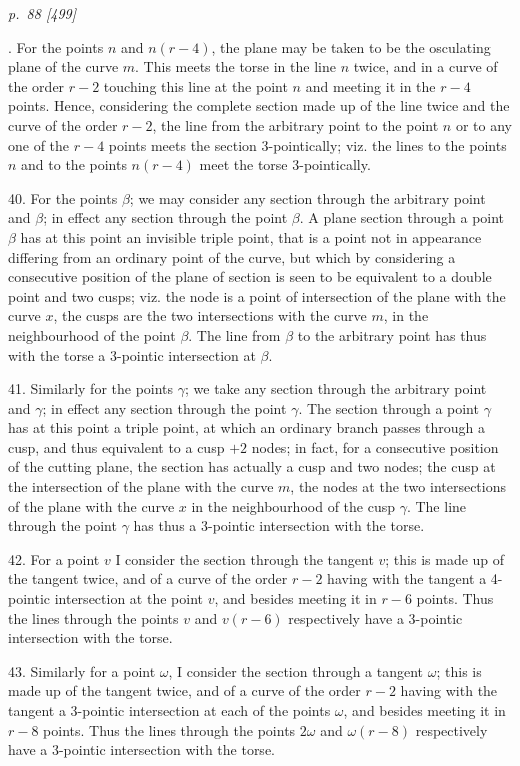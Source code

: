 \documentclass[11pt,a4paper]{article}
\newcommand{\pagemarker}[2]{\clearpage\noindent\textit{p.~#1 [#2]}\par\medskip}
\begin{document}
\pagemarker{88}{499}
39. For the points \(n\) and \(n(r-4)\), the plane may be taken to be the osculating
plane of the curve \(m\). This meets the torse in the line \(n\) twice, and in a curve
of the order \(r-2\) touching this line at the point \(n\) and meeting it in the \(r-4\)
points. Hence, considering the complete section made up of the line twice and the
curve of the order \(r-2\), the line from the arbitrary point to the point \(n\) or to
any one of the \(r-4\) points meets the section 3-pointically; viz. the lines to the
points \(n\) and to the points \(n(r-4)\) meet the torse 3-pointically.

40. For the points \(\beta\); we may consider any section through the arbitrary point
and \(\beta\); in effect any section through the point \(\beta\). A plane section through
a point \(\beta\) has at this point an invisible triple point, that is a point not in
appearance differing from an ordinary point of the curve, but which by considering a
consecutive position of the plane of section is seen to be equivalent to a double point
and two cusps; viz. the node is a point of intersection of the plane with the curve
\(x\), the cusps are the two intersections with the curve \(m\), in the neighbourhood
of the point \(\beta\). The line from \(\beta\) to the arbitrary point has thus with the
torse a 3-pointic intersection at \(\beta\).

41. Similarly for the points \(\gamma\); we take any section through the arbitrary
point and \(\gamma\); in effect any section through the point \(\gamma\). The section
through a point \(\gamma\) has at this point a triple point, at which an ordinary branch
passes through a cusp, and thus equivalent to a cusp \(+2\) nodes; in fact, for a
consecutive position of the cutting plane, the section has actually a cusp and two
nodes; the cusp at the intersection of the plane with the curve \(m\), the nodes at
the two intersections of the plane with the curve \(x\) in the neighbourhood of the
cusp \(\gamma\). The line through the point \(\gamma\) has thus a 3-pointic intersection
with the torse.

42. For a point \(v\) I consider the section through the tangent \(v\); this is made
up of the tangent twice, and of a curve of the order \(r-2\) having with the tangent a
4-pointic intersection at the point \(v\), and besides meeting it in \(r-6\) points. Thus
the lines through the points \(v\) and \(v(r-6)\) respectively have a 3-pointic
intersection with the torse.

43. Similarly for a point \(\omega\), I consider the section through a tangent \(\omega\);
this is made up of the tangent twice, and of a curve of the order \(r-2\) having with
the tangent a 3-pointic intersection at each of the points \(\omega\), and besides meeting
it in \(r-8\) points. Thus the lines through the points \(2\omega\) and \(\omega(r-8)\)
respectively have a 3-pointic intersection with the torse.
\end{document}
